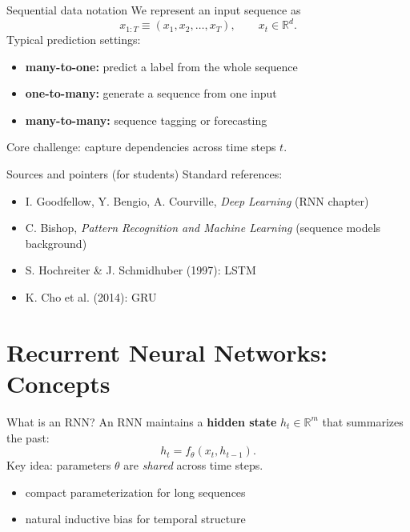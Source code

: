 \documentclass{beamer}
\begin{document}
\begin{frame}{Sequential data notation}
We represent an input sequence as
\[
x_{1:T} \equiv (x_1,x_2,\dots,x_T), \qquad x_t\in\mathbb{R}^{d}.
\]
Typical prediction settings:
\begin{itemize}
\item \textbf{many-to-one:} predict a label from the whole sequence
\item \textbf{one-to-many:} generate a sequence from one input
\item \textbf{many-to-many:} sequence tagging or forecasting
\end{itemize}

Core challenge: capture dependencies across time steps \(t\).
\end{frame}

\begin{frame}{Sources and pointers (for students)}
Standard references:
\begin{itemize}
\item I. Goodfellow, Y. Bengio, A. Courville, \emph{Deep Learning} (RNN chapter)
\item C. Bishop, \emph{Pattern Recognition and Machine Learning} (sequence models background)
\item S. Hochreiter \& J. Schmidhuber (1997): LSTM
\item K. Cho et al. (2014): GRU
\end{itemize}
\end{frame}

\section{Recurrent Neural Networks: Concepts}

\begin{frame}{What is an RNN?}
An RNN maintains a \textbf{hidden state} \(h_t\in\mathbb{R}^m\) that summarizes the past:
\[
h_t = f_\theta(x_t,h_{t-1}).
\]
Key idea: parameters \(\theta\) are \emph{shared} across time steps.
\begin{itemize}
\item compact parameterization for long sequences
\item natural inductive bias for temporal structure
\end{itemize}
\end{frame}
\end{document}
